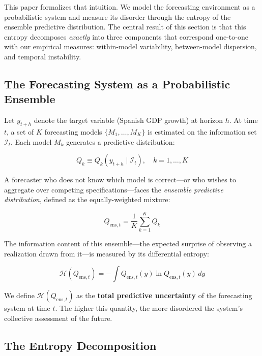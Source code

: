 \documentclass[12pt,a4paper]{article}
\theoremstyle{remark}
\begin{document}
This paper formalizes that intuition. We model the forecasting environment
as a probabilistic system and measure its disorder through the entropy of
the ensemble predictive distribution. The central result of this section is
that this entropy decomposes \emph{exactly} into three components that
correspond one-to-one with our empirical measures: within-model
variability, between-model dispersion, and temporal instability.

\subsection{The Forecasting System as a Probabilistic Ensemble}

Let $y_{t+h}$ denote the target variable (Spanish GDP growth) at horizon
$h$. At time $t$, a set of $K$ forecasting models $\{M_1, \ldots, M_K\}$
is estimated on the information set $\mathcal{I}_t$. Each model $M_k$
generates a predictive distribution:

\begin{equation}
    Q_k \equiv Q_k(y_{t+h} \mid \mathcal{I}_t), \quad k = 1, \ldots, K
    \label{eq:predictive_dist}
\end{equation}

A forecaster who does not know which model is correct—or who wishes to
aggregate over competing specifications—faces the \emph{ensemble
predictive distribution}, defined as the equally-weighted mixture:

\begin{equation}
    Q_{\text{ens},t} = \frac{1}{K} \sum_{k=1}^{K} Q_k
    \label{eq:ensemble}
\end{equation}

The information content of this ensemble—the expected surprise of
observing a realization drawn from it—is measured by its differential
entropy:

\begin{equation}
    \mathcal{H}(Q_{\text{ens},t}) = -\int Q_{\text{ens},t}(y)
    \ln Q_{\text{ens},t}(y)\, dy
    \label{eq:total_entropy}
\end{equation}

We define $\mathcal{H}(Q_{\text{ens},t})$ as the \textbf{total predictive
uncertainty} of the forecasting system at time $t$. The higher this
quantity, the more disordered the system's collective assessment of the
future.

\subsection{The Entropy Decomposition}
\end{document}
